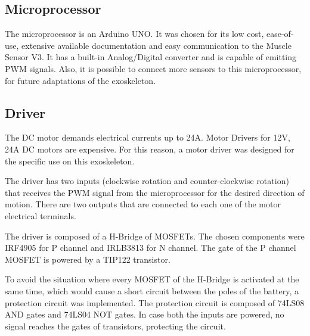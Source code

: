    \subsection{Microprocessor}
   
   The microprocessor is an Arduino UNO. It was chosen for its low cost, ease-of-use, extensive available documentation and easy communication to the Muscle Sensor V3. It has a built-in Analog/Digital converter and is capable of emitting PWM signals. Also, it is possible to connect more sensors to this microprocessor, for future adaptations of the exoskeleton.  

   
   \subsection{Driver}
   
   The DC motor demands electrical currents up to 24A. Motor Drivers for 12V, 24A DC motors are expensive. For this reason, a motor driver was designed for the specific use on this exoskeleton.
   
   The driver has two inputs (clockwise rotation and counter-clockwise rotation) that receives the PWM signal from the microprocessor for the desired direction of motion. There are two outputs that are connected to each one of the motor electrical terminals.
   
   
   The driver is composed of a H-Bridge of MOSFETs. The chosen components were IRF4905 for P channel and IRLB3813 for N channel. The gate of the P channel MOSFET is powered by a TIP122 transistor.
   
   To avoid the situation where every MOSFET of the H-Bridge is activated at the same time, which would cause a short circuit between the poles of the battery, a protection circuit was implemented. The protection circuit is composed of 74LS08 AND gates and 74LS04 NOT gates. In case both the inputs are powered, no signal reaches the gates of transistors, protecting the circuit.
   
      